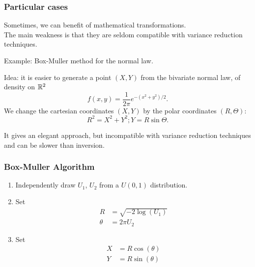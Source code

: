 \documentclass{beamer}
\begin{document}
	\begin{frame}
		\frametitle{Particular cases}
		
		Sometimes, we can benefit of mathematical transformations.\\
		The main weakness is that they are seldom compatible with variance
		reduction techniques.
		
		\mbox{}
		
		{\blue Example}: Box-Muller method for the normal law.
		
		\mbox{}
		
		{\red Idea}: it is easier to generate a point $(X, Y)$ from the bivariate
		normal law, of density on $\mathbb{R}^2$
		\[
		f (x, y ) = \frac{1}{2\pi} e^{-(x^2 +y^2 )/2}.
		\]
		We change the cartesian coordinates $(X,Y)$ by the polar coordinates $(R, \Theta)$:\\
		\[
		R^2 = X^2 + Y^2 ; Y = R \sin \Theta.
		\]
		
		It gives an elegant approach, but incompatible with variance reduction techniques and can be slower than inversion.
		
\end{frame}

\begin{frame}
\frametitle{Box-Muller Algorithm}

\begin{enumerate}
\item
Independently draw $U_1$, $U_2$ from a $U(0,1)$ distribution.
\item
Set
\begin{align*}
R &= \sqrt{-2 \log (U_1)} \\
\theta &= 2 \pi U_2
\end{align*}
\item
Set
\begin{align*}
X &= R \cos(\theta) \\
Y &= R \sin(\theta)
\end{align*}
\end{enumerate}
		
\end{frame}
	
\end{document}

